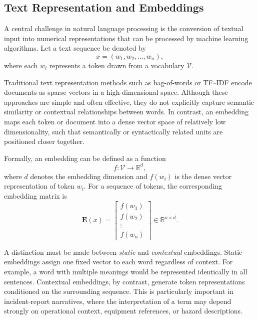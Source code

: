 \documentclass[11pt, titlepage, bibliography=totoc]{scrreprt}
\begin{document}
\subsection{Text Representation and Embeddings}
A central challenge in natural language processing is the conversion of textual input into numerical representations that can be processed by machine learning algorithms. Let a text sequence be denoted by
\begin{equation}
x = (w_1, w_2, \dots, w_n),
\end{equation}
where each $w_i$ represents a token drawn from a vocabulary $\mathcal{V}$.

Traditional text representation methods such as bag-of-words or TF--IDF encode documents as sparse vectors in a high-dimensional space. Although these approaches are simple and often effective, they do not explicitly capture semantic similarity or contextual relationships between words. In contrast, an embedding maps each token or document into a dense vector space of relatively low dimensionality, such that semantically or syntactically related units are positioned closer together.

Formally, an embedding can be defined as a function
\begin{equation}
f : \mathcal{V} \rightarrow \mathbb{R}^{d},
\end{equation}
where $d$ denotes the embedding dimension and $f(w_i)$ is the dense vector representation of token $w_i$. For a sequence of tokens, the corresponding embedding matrix is
\begin{equation}
\mathbf{E}(x) =
\begin{bmatrix}
f(w_1) \\
f(w_2) \\
\vdots \\
f(w_n)
\end{bmatrix}
\in \mathbb{R}^{n \times d}.
\end{equation}

A distinction must be made between \emph{static} and \emph{contextual} embeddings. Static embeddings assign one fixed vector to each word regardless of context. For example, a word with multiple meanings would be represented identically in all sentences. Contextual embeddings, by contrast, generate token representations conditioned on the surrounding sequence. This is particularly important in incident-report narratives, where the interpretation of a term may depend strongly on operational context, equipment references, or hazard descriptions.
\end{document}
